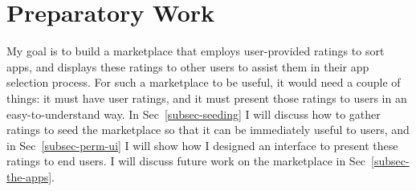 \documentclass[11pt]{article}
\begin{document}


\section{Preparatory Work}
\label{sec-prep-work}

My goal is to build a marketplace that employs user-provided 
ratings to sort apps, and displays these ratings to other users 
to assist them in their app selection process. For such a marketplace
to be useful, it would need a couple of things:  it must have
user ratings, and it must present those ratings to users in
an easy-to-understand way. In Sec~\ref{subsec-seeding} I will 
discuss how to gather ratings to seed the marketplace so that 
it can be immediately useful to users, and in Sec~\ref{subsec-perm-ui}
I will show how I designed an interface to present these ratings 
to end users. I will discuss future work on the marketplace in 
Sec~\ref{subsec-the-apps}.
\end{document}
